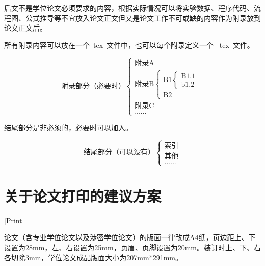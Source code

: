 后文不是学位论文必须要求的内容，根据实际情况可以将实验数据、程序代码、流程图、公式推导等不宜放入论文正文但又是论文工作不可或缺的内容作为附录放到论文正文后。

所有附录内容可以放在一个~tex~文件中，也可以每个附录定义一个 ~tex~文件。

\[
  \text{附录部分（必要时）}
  \begin{cases}
    \text{附录A}                 \\
    \text{附录B}
    \begin{cases}
      \text{B1}
      \begin{cases}
        \text{B1.1} \\
        \text{b1.2}
      \end{cases} \\
      \text{B2}
    \end{cases} \\
    \text{附录C}                 \\
    \text{......}
  \end{cases}
\]

结尾部分是非必须的，必要时可以加入。

\[
  \text{结尾部分（可以没有）}
  \begin{cases}
    \text{索引} \\
    \text{其他} \\
    \text{......}
  \end{cases}
\]

\chapter{关于论文打印的建议方案}[Print]

论文（含专业学位论文以及涉密学位论文）的版面一律改成A4纸，页边距上、下设置为28mm，左、右设置为25mm，页眉、页脚设置为20mm。装订时上、下、右各切除3mm，学位论文成品版面大小为207mm*291mm。

